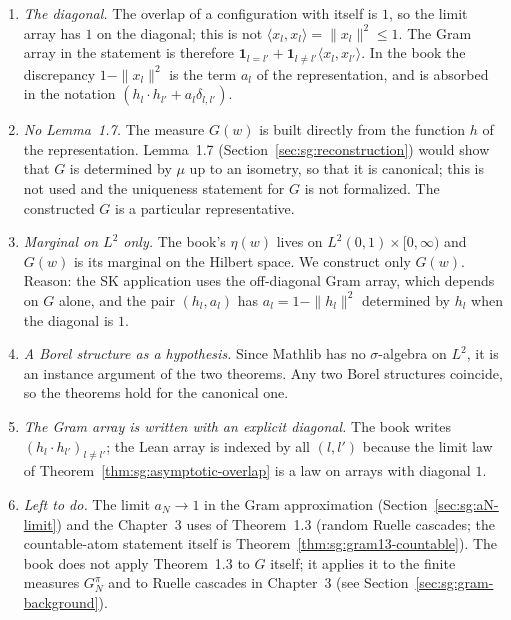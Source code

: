\begin{remark}\label{rem:sg:gibbs-measure-deviation}
\begin{enumerate}
\item \emph{The diagonal.} The overlap of a configuration with itself is $1$, so the limit array has $1$ on the diagonal; this is not $\langle x_l,x_l\rangle=\|x_l\|^2\le1$. The Gram array in the statement is therefore $\mathbf 1_{l=l'}+\mathbf 1_{l\ne l'}\langle x_l,x_{l'}\rangle$. In the book the discrepancy $1-\|x_l\|^2$ is the term $a_l$ of the representation, and is absorbed in the notation $(h_l\cdot h_{l'}+a_l\delta_{l,l'})$.
\item \emph{No Lemma~1.7.} The measure $G(w)$ is built directly from the function $h$ of the representation. Lemma~1.7 (Section~\ref{sec:sg:reconstruction}) would show that $G$ is determined by $\mu$ up to an isometry, so that it is canonical; this is not used and the uniqueness statement for $G$ is not formalized. The constructed $G$ is a particular representative.
\item \emph{Marginal on $L^2$ only.} The book's $\eta(w)$ lives on $L^2(0,1)\times[0,\infty)$ and $G(w)$ is its marginal on the Hilbert space. We construct only $G(w)$. Reason: the SK application uses the off-diagonal Gram array, which depends on $G$ alone, and the pair $(h_l,a_l)$ has $a_l=1-\|h_l\|^2$ determined by $h_l$ when the diagonal is $1$.
\item \emph{A Borel structure as a hypothesis.} Since Mathlib has no $\sigma$-algebra on $L^2$, it is an instance argument of the two theorems. Any two Borel structures coincide, so the theorems hold for the canonical one.
\item \emph{The Gram array is written with an explicit diagonal.} The book writes $(h_l\cdot h_{l'})_{l\ne l'}$; the Lean array is indexed by all $(l,l')$ because the limit law of Theorem~\ref{thm:sg:asymptotic-overlap} is a law on arrays with diagonal $1$.
\item \emph{Left to do.} The limit $a_N\to1$ in the Gram approximation (Section~\ref{sec:sg:aN-limit}) and the Chapter~3 uses of Theorem~1.3 (random Ruelle cascades; the countable-atom statement itself is Theorem~\ref{thm:sg:gram13-countable}). The book does not apply Theorem~1.3 to $G$ itself; it applies it to the finite measures $G^\pi_N$ and to Ruelle cascades in Chapter~3 (see Section~\ref{sec:sg:gram-background}).
\end{enumerate}
\end{remark}

